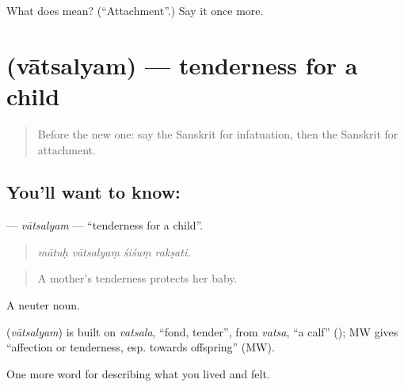 \begin{tcolorbox}[breakable,colback=teal!4,colframe=teal!35!black,title={Before you move on}]
What does  mean? (\textquotedblleft{}Attachment\textquotedblright{}.) Say it once more.
\end{tcolorbox}
\section[\texorpdfstring{\sk{वात्सल्यम्} (vātsalyam)}{वात्सल्यम् (vātsalyam)}]{ (vātsalyam) — tenderness for a child}

\label{lesson:SA-C455-vatsalyam}



\begin{quote}
Before the new one: say the Sanskrit for infatuation, then the Sanskrit for attachment.
\end{quote}

\subsection*{You'll want to know: }
\textbf{} — \emph{vātsalyam} — \textquotedblleft{}tenderness for a child\textquotedblright{}.

\begin{quote}
   
\end{quote}

\begin{quote}
\emph{mātuḥ vātsalyaṃ śiśuṃ rakṣati.}
\end{quote}

\begin{quote}
A mother's tenderness protects her baby.
\end{quote}

A neuter noun.

\begin{cousinweb}
\textbf{} (\emph{vātsalyam}) is built on \emph{vatsala}, \textquotedblleft{}fond, tender\textquotedblright{}, from \emph{vatsa}, \textquotedblleft{}a calf\textquotedblright{} (\textbf{}); MW gives \textquotedblleft{}affection or tenderness, esp. towards offspring\textquotedblright{} (MW).
\end{cousinweb}

\begin{grammarlens}[title={What you've built}]
One more word for describing what you lived and felt.
\end{grammarlens}

